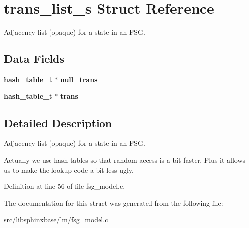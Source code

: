 \section{trans\+\_\+list\+\_\+s Struct Reference}
\label{structtrans__list__s}


Adjacency list (opaque) for a state in an F\+SG.  


\subsection*{Data Fields}
\begin{DoxyCompactItemize}
\item 
\mbox{\label{structtrans__list__s_a15223c70915f916f5656627985c6fd39}} 
\textbf{ hash\+\_\+table\+\_\+t} $\ast$ {\bfseries null\+\_\+trans}
\item 
\mbox{\label{structtrans__list__s_ade18f3313bc542cee585f0c5c16de96a}} 
\textbf{ hash\+\_\+table\+\_\+t} $\ast$ {\bfseries trans}
\end{DoxyCompactItemize}


\subsection{Detailed Description}
Adjacency list (opaque) for a state in an F\+SG. 

Actually we use hash tables so that random access is a bit faster. Plus it allows us to make the lookup code a bit less ugly. 

Definition at line 56 of file fsg\+\_\+model.\+c.



The documentation for this struct was generated from the following file\+:\begin{DoxyCompactItemize}
\item 
src/libsphinxbase/lm/fsg\+\_\+model.\+c\end{DoxyCompactItemize}
